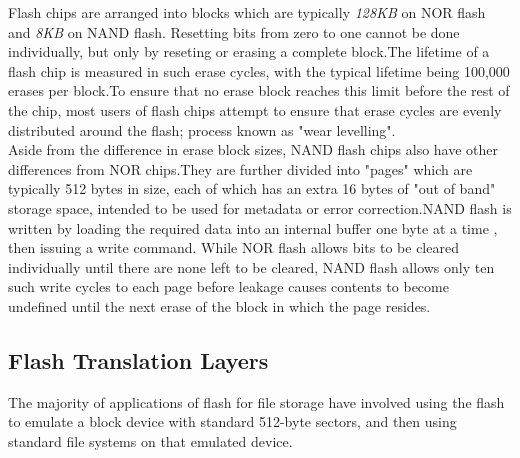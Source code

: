 \documentclass[conference]{IEEEtran}
\begin{document}
Flash chips are arranged into blocks which are typically {\em 128KB} on NOR flash and {\em 8KB} on 
NAND flash. Resetting bits from zero to one cannot be done individually, but only by 
reseting or erasing a complete block.The lifetime of a flash chip is measured in such erase
cycles, with the typical lifetime being 100,000 erases per block.To ensure that no erase 
block reaches this limit before the rest of the chip, most users of flash chips attempt
to ensure that erase cycles are evenly distributed around the flash; process known as
"wear levelling".\\

Aside from the difference in erase block sizes, NAND flash chips also have other differences from
NOR chips.They are further divided into "pages" which are typically 512 bytes in size,
each of which has an extra 16 bytes of "out of band" storage space, intended to be used
for metadata or error correction.NAND flash is written by loading the required data into an 
internal buffer one byte at a time , then issuing a write command. While NOR flash allows
bits to be cleared individually until there are none left to be cleared, NAND flash 
allows only ten such write cycles to each page before leakage causes contents to become 
undefined until the next erase of the block in which the page resides.


 

\subsection{Flash Translation Layers} 

The majority of applications of flash for file storage have involved
using the flash to emulate a block device with standard 512-byte sectors, and then 
using standard file systems on that emulated device.\\
\end{document}
